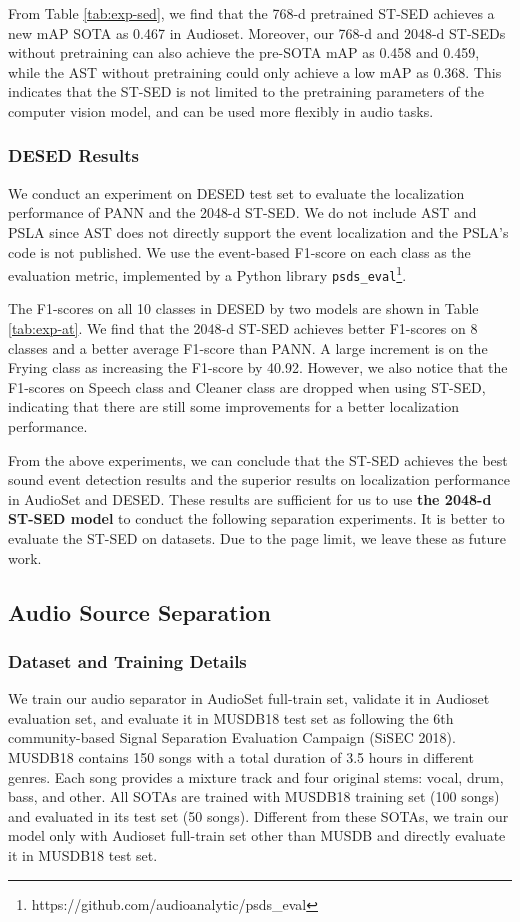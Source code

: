 \documentclass[letterpaper]{article} \usepackage{aaai22}  \usepackage{times}  \usepackage{helvet}  \usepackage{courier}  \usepackage[hyphens]{url}  \usepackage{graphicx} \urlstyle{rm} \def\UrlFont{\rm}  \usepackage{natbib}  \usepackage{caption} \DeclareCaptionStyle{ruled}{labelfont=normalfont,labelsep=colon,strut=off} \frenchspacing  \setlength{\pdfpagewidth}{8.5in}  \setlength{\pdfpageheight}{11in}  \usepackage{algorithm}
\begin{document}
From Table \ref{tab:exp-sed}, we find that the 768-d pretrained ST-SED achieves a new mAP SOTA as 0.467 in Audioset. Moreover, our 768-d and 2048-d ST-SEDs without pretraining can also achieve the pre-SOTA mAP as 0.458 and 0.459, while the AST without pretraining could only achieve a low mAP as 0.368. This indicates that the ST-SED is not limited to the pretraining parameters of the computer vision model, and can be used more flexibly in audio tasks.

\subsubsection{DESED Results}
We conduct an experiment on DESED test set to evaluate the localization performance of PANN and the 2048-d ST-SED. We do not include AST and PSLA since AST does not directly support the event localization and the PSLA's code is not published. We use the event-based F1-score on each class as the evaluation metric, implemented by a Python library \texttt{psds\_eval}\footnote{https://github.com/audioanalytic/psds\_eval}. 

The F1-scores on all 10 classes in DESED by two models are shown in Table \ref{tab:exp-at}. We find that the 2048-d ST-SED achieves better F1-scores on 8 classes and a better average F1-score than PANN. A large increment is on the Frying class as increasing the F1-score by 40.92. However, we also notice that the F1-scores on Speech class and Cleaner class are dropped when using ST-SED, indicating that there are still some improvements for a better localization performance. 

From the above experiments, we can conclude that the ST-SED achieves the best sound event detection results and the superior results on localization performance in AudioSet and DESED. These results are sufficient for us to use \textbf{the 2048-d ST-SED model} to conduct the following separation experiments. It is better to evaluate the ST-SED on datasets. Due to the page limit, we leave these as future work.


\subsection{Audio Source Separation}
\subsubsection{Dataset and Training Details} 
We train our audio separator in AudioSet full-train set, validate it in Audioset evaluation set, and evaluate it in MUSDB18 test set as following the 6th community-based Signal Separation Evaluation Campaign (SiSEC 2018). MUSDB18 contains 150 songs with a total duration of 3.5 hours in different genres. Each song provides a mixture track and four original stems: vocal, drum, bass, and other. All SOTAs are trained with MUSDB18 training set (100 songs) and evaluated in its test set (50 songs). Different from these SOTAs, we train our model only with Audioset full-train set other than MUSDB and directly evaluate it in MUSDB18 test set.
\end{document}
